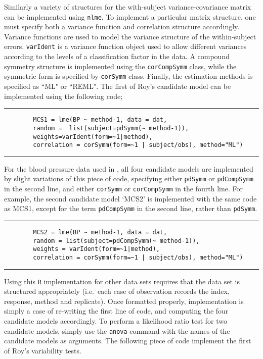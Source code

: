 \documentclass[12pt, a4paper]{report}
\theoremstyle{plain}
\theoremstyle{definition}
\theoremstyle{remark}
\begin{document}
		Similarly a variety of structures for the with-subject variance-covariance matrix can be implemented using \texttt{nlme}. To implement a particular matrix structure, one must specify both a variance function and correlation structure accordingly. Variance functions are used to model the variance structure of the within-subject errors. \texttt{varIdent} is a variance function object used to allow different variances according to the levels of a classification factor in the data. A compound symmetry structure is implemented using the \texttt{corCompSymm} class, while the symmetric form is specified by \texttt{corSymm} class. Finally, the estimation methods is specified as ``ML" or ``REML".
		\newpage
		The first of Roy's candidate model can be implemented using the following code;\\
		\hrule
		\begin{verbatim}
		MCS1 = lme(BP ~ method-1, data = dat,
		random =  list(subject=pdSymm(~ method-1)),
		weights=varIdent(form=~1|method),
		correlation = corSymm(form=~1 | subject/obs), method="ML")
		\end{verbatim}
		\hrule
		\vspace{1cm}
		For the blood pressure data used in \citet{roy}, all four candidate models are implemented by slight variations of this piece of code, specifying either \texttt{pdSymm} or \texttt{pdCompSymm} in the second line, and either \texttt{corSymm} or \texttt{corCompSymm} in the fourth line.
		For example, the second candidate model `MCS2' is implemented with the same code as MCS1, except for the term \texttt{pdCompSymm} in the second line, rather than \texttt{pdSymm}.
		\\
		\hrule
		\begin{verbatim}
		MCS2 = lme(BP ~ method-1, data = dat,
		random = list(subject=pdCompSymm(~ method-1)),
		weights = varIdent(form=~1|method),
		correlation = corSymm(form=~1 | subject/obs), method="ML")
		\end{verbatim}
		\hrule
		\vspace{1cm}
		Using this \texttt{R} implementation for other data sets requires that the data set is structured appropriately (i.e.\ each case of observation records the index, response, method and replicate). Once formatted properly, implementation is simply a case of re-writing the first line of code, and computing the four candidate models accordingly.
		\newpage
		To perform a likelihood ratio test for two candidate models, simply use the \texttt{anova} command with the names of the candidate models as arguments. The following piece of code implement the first of Roy's variability tests.
\end{document}
